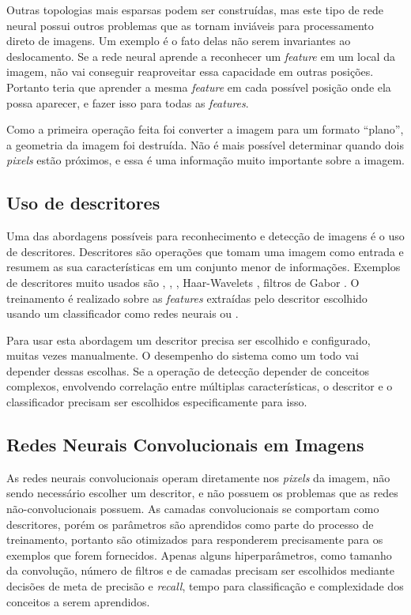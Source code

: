 Outras topologias mais esparsas podem ser construídas, mas este tipo de rede
neural possui outros problemas que as tornam inviáveis para processamento direto
de imagens. Um exemplo é o fato delas não serem invariantes ao deslocamento. Se
a rede neural aprende a reconhecer um \emph{feature} em um local da
imagem, não vai
conseguir reaproveitar essa capacidade em outras posições. Portanto teria que
aprender a mesma \emph{feature} em cada possível posição onde ela possa
aparecer, e fazer isso para todas as \emph{features}.

Como a primeira operação feita foi converter a imagem para um formato “plano”, a
geometria da imagem foi destruída. Não é mais possível determinar quando dois
\emph{pixels} estão próximos, e essa é uma informação muito importante sobre a
imagem.

\subsection{Uso de descritores}
Uma das abordagens possíveis para reconhecimento e detecção de imagens é o uso
de descritores. Descritores são operações que tomam uma imagem como entrada e
resumem as sua
características em um conjunto menor de informações. Exemplos de descritores muito
usados são
	\cite{wang1990texture},
 \cite{rublee2011orb},
 \cite{dalal2005histograms},
Haar-Wavelets \cite{nabout2008object},
filtros de Gabor \cite{riaz2012invariant}.
O treinamento é realizado sobre
as \emph{features} extraídas pelo descritor escolhido usando um
classificador como redes neurais ou  \cite{boser1992training}
	\cite{cortes1995support}.

Para usar esta abordagem um descritor precisa ser escolhido e configurado,
muitas vezes manualmente. O desempenho do sistema como um todo vai depender
dessas escolhas. Se a operação de detecção depender de conceitos complexos,
envolvendo correlação entre múltiplas características, o descritor e o
classificador precisam ser escolhidos especificamente para isso.

\subsection{Redes Neurais Convolucionais em Imagens}
As redes neurais convolucionais operam diretamente nos \emph{pixels} da imagem,
não sendo necessário escolher um descritor, e não possuem os problemas que as
redes não-convolucionais possuem. As camadas convolucionais se comportam como
descritores, porém os parâmetros são aprendidos como parte do processo de
treinamento, portanto são otimizados para responderem precisamente para os
exemplos que forem fornecidos. Apenas alguns hiperparâmetros, como tamanho
da convolução, número de filtros e de camadas precisam ser escolhidos mediante
decisões de meta de precisão e \emph{recall}, tempo para classificação e
complexidade dos conceitos a serem aprendidos.


